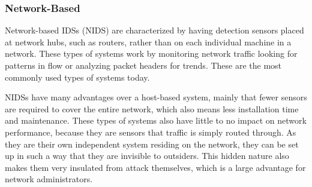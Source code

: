 \documentclass{acm_proc_article-sp}
\begin{document}
    	\subsubsection{Network-Based}
    		Network-based IDSs (NIDS) are characterized by having detection sensors placed at network hubs, such as routers, rather than on each individual machine in a network. These types of systems work by monitoring network traffic looking for patterns in flow or analyzing packet headers for trends. These are the most commonly used types of systems today. 
    		
    		NIDSs have many advantages over a host-based system, mainly that fewer sensors are required to cover the entire network, which also means less installation time and maintenance. These types of systems also have little to no impact on network performance, because they are sensors that traffic is simply routed through. As they are their own independent system residing on the network, they can be set up in such a way that they are invisible to outsiders. This hidden nature also makes them very insulated from attack themselves, which is a large advantage for network administrators. 
    		
\end{document}
